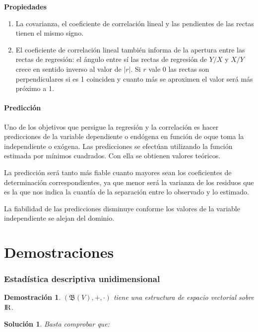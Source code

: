 \documentclass[10pt, a4paper]{article}
\theoremstyle{theorem-style}
\theoremstyle{definition-style}
\theoremstyle{remark-style}
\theoremstyle{example-style}
\theoremstyle{definition-style}
\newtheorem{ejer}{Demostración}[section]
\theoremstyle{remark-style}
\newtheorem*{sol}{Solución}
\begin{document}
\textbf{Propiedades}

\begin{enumerate}
	\item La covarianza, el coeficiente de correlación lineal y las pendientes de las
rectas tienen el mismo signo.

	\item El coeficiente de correlación lineal también informa de la apertura entre las
rectas de regresión: el ángulo entre sí las rectas de regresión de $Y/X$ y $X/Y$
crece en sentido inverso al valor de $ |r| $. Si $r$ vale 0 las rectas son
perpendiculares si es 1 coinciden y cuanto más se aproximen el valor será más
próximo a 1.
\end{enumerate}

\pagebreak

\subsection{Predicción}

Uno de los objetivos que persigue la regresión y la correlación es hacer
predicciones de la variable dependiente o endógena en función de oque toma la
independiente o exógena. Las predicciones se efectúan utilizando la función
estimada por mínimos cuadrados. Con ella se obtienen valores teóricos.

La
predicción será tanto más fiable cuanto mayores sean los coeficientes de
determinación correspondientes, ya que menor será la varianza de los residuos
que es la que nos indica la cuantía de la separación entre lo observado y lo
estimado.

La fiabilidad de las predicciones disminuye conforme los valores de la variable
independiente se alejan del dominio.

\pagebreak
\part{Demostraciones}

\section{Estadística descriptiva unidimensional}

\begin{ejer}
  $(\mathfrak{B}(V), +, \cdot)$ tiene una estructura de espacio vectorial sobre $\rm I\!R$.
\end{ejer}

\begin{sol}
  Basta comprobar que:
  
\end{sol}
\end{document}
